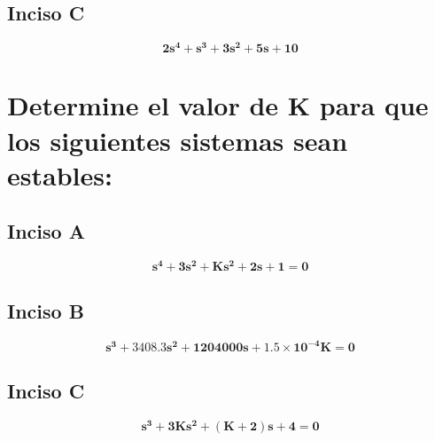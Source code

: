 \documentclass[11pt, twoside]{article}
\begin{document}
\subsection{Inciso C}
\begin{equation*}
    \mathbf{2s^{4} + s^{3} + 3s^{2} + 5s + 10}
\end{equation*}
\section{Determine el valor de $\mathbf{K}$ para que los siguientes sistemas sean estables:}
\subsection{Inciso A}
\begin{equation*}
    \mathbf{s^{4} + 3s^{2} + Ks^{2} + 2s + 1 = 0}
\end{equation*}
\subsection{Inciso B}
\begin{equation*}
    \mathbf{s^{3} + 3408.3s^{2} + 1204000s + 1.5 \times 10^{-4}K = 0}
\end{equation*}
\subsection{Inciso C}
\begin{equation*}
    \mathbf{s^{3} + 3Ks^{2} + (K + 2)s + 4 = 0}
\end{equation*}
\end{document}
